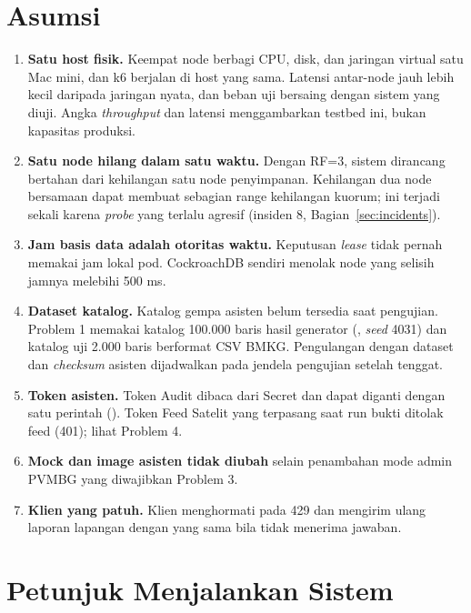 \documentclass{fairmeta}
\newcommand{\code}[1]{\texttt{\detokenize{#1}}}
\begin{document}
\section{Asumsi}

\begin{enumerate}
  \item \textbf{Satu host fisik.} Keempat node berbagi CPU, disk, dan jaringan virtual satu Mac mini, dan k6 berjalan di host yang sama. Latensi antar-node jauh lebih kecil daripada jaringan nyata, dan beban uji bersaing dengan sistem yang diuji. Angka \textit{throughput} dan latensi menggambarkan testbed ini, bukan kapasitas produksi.
  \item \textbf{Satu node hilang dalam satu waktu.} Dengan RF=3, sistem dirancang bertahan dari kehilangan satu node penyimpanan. Kehilangan dua node bersamaan dapat membuat sebagian range kehilangan kuorum; ini terjadi sekali karena \textit{probe} yang terlalu agresif (insiden 8, Bagian~\ref{sec:incidents}).
  \item \textbf{Jam basis data adalah otoritas waktu.} Keputusan \textit{lease} tidak pernah memakai jam lokal pod. CockroachDB sendiri menolak node yang selisih jamnya melebihi 500 ms.
  \item \textbf{Dataset katalog.} Katalog gempa asisten belum tersedia saat pengujian. Problem 1 memakai katalog 100.000 baris hasil generator (, \textit{seed} 4031) dan katalog uji 2.000 baris berformat CSV BMKG. Pengulangan dengan dataset dan \textit{checksum} asisten dijadwalkan pada jendela pengujian setelah tenggat.
  \item \textbf{Token asisten.} Token Audit dibaca dari Secret dan dapat diganti dengan satu perintah (\code{set-audit-token}). Token Feed Satelit yang terpasang saat run bukti ditolak feed (401); lihat Problem 4.
  \item \textbf{Mock dan image asisten tidak diubah} selain penambahan mode admin PVMBG yang diwajibkan Problem 3.
  \item \textbf{Klien yang patuh.} Klien menghormati \code{Retry-After} pada 429 dan mengirim ulang laporan lapangan dengan \code{report_id} yang sama bila tidak menerima jawaban.
\end{enumerate}

\section{Petunjuk Menjalankan Sistem}
\end{document}
